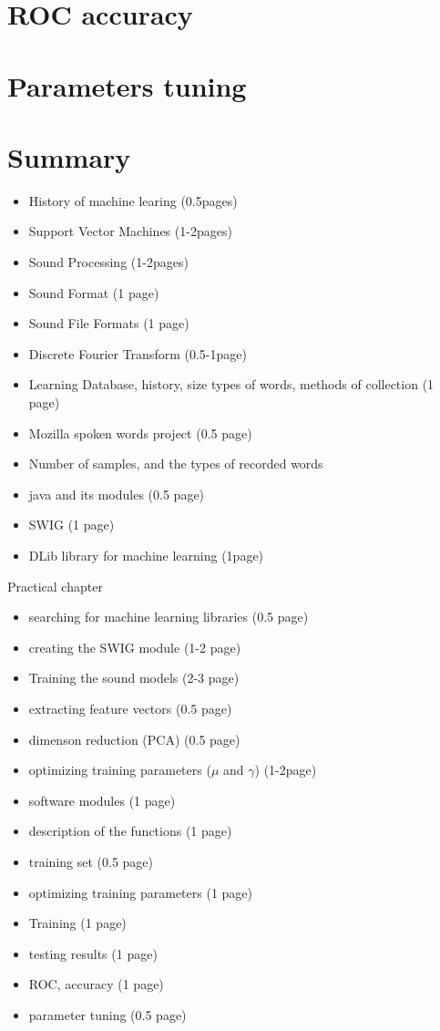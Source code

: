 \documentclass[english,12pt,oneside,a4paper]{article}
\begin{document}
\begin{center}
		\section{ROC accuracy}
		
		\section{Parameters tuning}
		
		\section{Summary}
		
\newpage
	\begin{itemize}
		\item History of machine learing (0.5pages)
		\item Support Vector Machines (1-2pages)
		\item Sound Processing (1-2pages)
		\item Sound Format (1 page)
		\item Sound File Formats (1 page)
		\item Discrete Fourier Transform (0.5-1page)
		\item Learning Database, history, size types of words, methods of collection (1 page)
		\item Mozilla spoken words project (0.5 page)
		\item Number of samples, and the types of recorded words
		\item java and its modules (0.5 page)
		\item SWIG (1 page)
		\item DLib library for machine learning (1page)
	\end{itemize}
	Practical chapter
	\begin{itemize}
		\item searching for machine learning libraries (0.5 page)
		\item creating the SWIG module (1-2 page)
		\item Training the sound models (2-3 page)
		\item extracting feature vectors (0.5 page)
		\item dimenson reduction (PCA) (0.5 page)
		\item optimizing training parameters ($\mu$ and $\gamma$) (1-2page)
		\item software modules (1 page)
		\item description of the functions (1 page)
		\item training set (0.5 page)
		\item optimizing training parameters (1 page)
		\item Training (1 page)
		\item testing results (1 page)
		\item ROC, accuracy (1 page)
		\item parameter tuning (0.5 page)
	\end{itemize}
	

\end{center}
\end{document}
